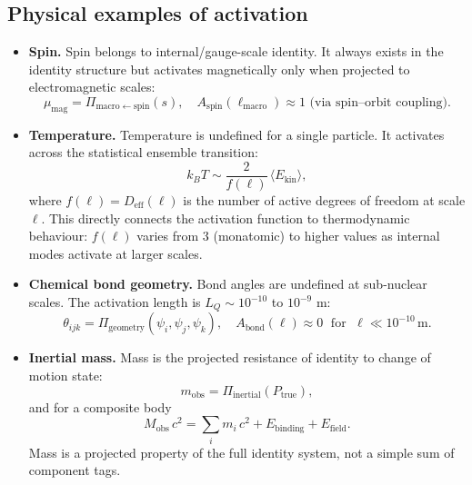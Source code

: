 \documentclass[11pt, a4paper, oneside]{article}
\theoremstyle{definition}
\theoremstyle{plain}
\theoremstyle{remark}
\begin{document}
\subsection{Physical examples of activation}

\begin{itemize}
  \item \textbf{Spin.}
    Spin belongs to internal/gauge-scale identity.
    It always exists in the identity structure but activates
    magnetically only when projected to electromagnetic scales:
    \begin{equation}
      \mu_\mathrm{mag} = \Pi_{\mathrm{macro} \leftarrow \mathrm{spin}}(s),
      \quad
      A_\mathrm{spin}(\ell_\mathrm{macro}) \approx 1
      \text{ (via spin--orbit coupling)}.
      \label{eq:spin_proj}
    \end{equation}

  \item \textbf{Temperature.}
    Temperature is undefined for a single particle.
    It activates across the statistical ensemble transition:
    \begin{equation}
      k_B T \sim \frac{2}{f(\ell)}\,\langle E_\mathrm{kin}\rangle,
      \label{eq:temp_proj}
    \end{equation}
    where $f(\ell) = D_\mathrm{eff}(\ell)$ is the number of
    active degrees of freedom at scale $\ell$.
    This directly connects the activation function to
    thermodynamic behaviour: $f(\ell)$ varies from 3 (monatomic)
    to higher values as internal modes activate at larger scales.

  \item \textbf{Chemical bond geometry.}
    Bond angles are undefined at sub-nuclear scales.
    The activation length is $L_Q \sim 10^{-10}$ to $10^{-9}$ m:
    \begin{equation}
      \theta_{ijk} = \Pi_\mathrm{geometry}(\psi_i, \psi_j, \psi_k),
      \quad
      A_\mathrm{bond}(\ell) \approx 0 \;\text{ for }\;
      \ell \ll 10^{-10}\,\text{m}.
      \label{eq:bond_proj}
    \end{equation}

  \item \textbf{Inertial mass.}
    Mass is the projected resistance of identity to change of motion state:
    \begin{equation}
      m_\mathrm{obs} = \Pi_\mathrm{inertial}(P_\mathrm{true}),
      \label{eq:mass_proj}
    \end{equation}
    and for a composite body
    \begin{equation}
      M_\mathrm{obs}\,c^2
      = \sum_i m_i\,c^2 + E_\mathrm{binding} + E_\mathrm{field}.
      \label{eq:mass_composite}
    \end{equation}
    Mass is a projected property of the full identity system, not
    a simple sum of component tags.


\end{itemize}
\end{document}
